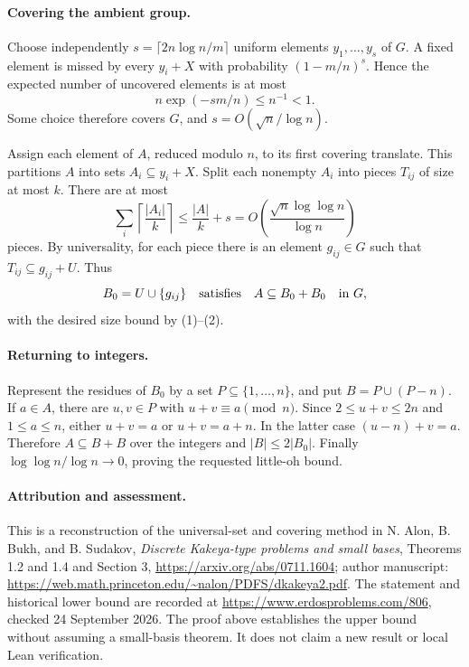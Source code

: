 \paragraph{Covering the ambient group.}
Choose independently
\(s=\lceil2n\log n/m\rceil\) uniform elements \(y_1,\ldots,y_s\) of \(G\). A fixed element is missed by every \(y_i+X\) with probability \((1-m/n)^s\). Hence the expected number of uncovered elements is at most
\[
 n\exp(-sm/n)\leq n^{-1}<1.
\]
Some choice therefore covers \(G\), and \(s=O(\sqrt n/\log n)\).

Assign each element of \(A\), reduced modulo \(n\), to its first covering translate. This partitions \(A\) into sets \(A_i\subseteq y_i+X\). Split each nonempty \(A_i\) into pieces \(T_{ij}\) of size at most \(k\). There are at most
\[
 \sum_i\left\lceil\frac{|A_i|}{k}\right\rceil
 \leq\frac{|A|}{k}+s
 =O\!\left(\frac{\sqrt n\log\log n}{\log n}\right)
\tag{2}
\]
pieces. By universality, for each piece there is an element \(g_{ij}\in G\) such that \(T_{ij}\subseteq g_{ij}+U\). Thus
\[
 B_0=U\cup\{g_{ij}\}
 \quad\hbox{satisfies}\quad A\subseteq B_0+B_0\quad\text{in }G,
\]
with the desired size bound by (1)--(2).

\paragraph{Returning to integers.}
Represent the residues of \(B_0\) by a set \(P\subseteq\{1,\ldots,n\}\), and put \(B=P\cup(P-n)\). If \(a\in A\), there are \(u,v\in P\) with \(u+v\equiv a\pmod n\). Since \(2\leq u+v\leq2n\) and \(1\leq a\leq n\), either \(u+v=a\) or \(u+v=a+n\). In the latter case \((u-n)+v=a\). Therefore \(A\subseteq B+B\) over the integers and \(|B|\leq2|B_0|\). Finally \(\log\log n/\log n\to0\), proving the requested little-oh bound.

\paragraph{Attribution and assessment.}
This is a reconstruction of the universal-set and covering method in N. Alon, B. Bukh, and B. Sudakov, \emph{Discrete Kakeya-type problems and small bases}, Theorems 1.2 and 1.4 and Section 3, \url{https://arxiv.org/abs/0711.1604}; author manuscript: \url{https://web.math.princeton.edu/~nalon/PDFS/dkakeya2.pdf}. The statement and historical lower bound are recorded at \url{https://www.erdosproblems.com/806}, checked 24 September 2026. The proof above establishes the upper bound without assuming a small-basis theorem. It does not claim a new result or local Lean verification.
